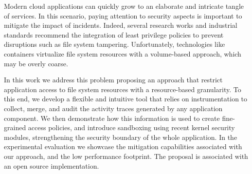 Modern cloud applications can quickly grow to an elaborate and
intricate tangle of services. In this scenario, paying attention to
security aspects is important to mitigate the impact of
incidents. Indeed, several research works and industrial standards
recommend the integration of least privilege policies to prevent
disruptions such as file system tampering.  Unfortunately,
technologies like containers virtualize file system resources with a
volume-based approach, which may be overly coarse.

In this work we address this problem proposing an approach that
restrict application access to file system resources with a
resource-based granularity. To this end, we develop a flexible and
intuitive tool that relies on instrumentation to collect, merge, and
audit the activity traces generated by any application component. We
then demonstrate how this information is used to create fine-grained
access policies, and introduce sandboxing using recent kernel
security modules, strengthening the security boundary of the whole
application.  In the experimental evaluation we showcase the
mitigation capabilities associated with our approach, and the low
performance footprint.  The proposal is associated with an open
source implementation.
